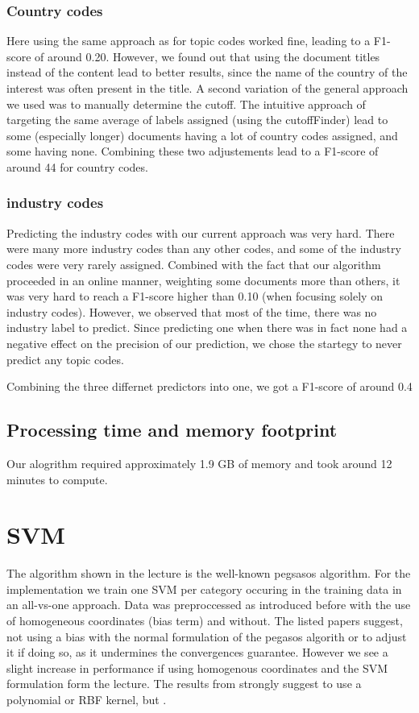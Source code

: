 \documentclass{article}
\begin{document}
            \subsubsection{ Country codes }
                Here using the same approach as for topic codes worked fine, leading to a F1-score of around 0.20. However, we found out that using the document titles instead of the content lead to better results, since the name of the country of the interest was often present in the title. A second variation of the general approach we used was to manually determine the cutoff. The intuitive approach of targeting the same average of labels assigned (using the cutoffFinder) lead to some (especially longer) documents having a lot of country codes assigned, and some having none.
                    Combining these two adjustements lead to a F1-score of around 44 for country codes.


            \subsubsection{industry codes }
            Predicting the industry codes with our current approach was very hard. There were many more industry codes than any other codes, and some of the industry codes were very rarely assigned.  Combined with the fact that our algorithm proceeded in an online manner, weighting some documents more than others, it was very hard to reach a F1-score higher than 0.10 (when focusing solely on industry codes). However, we observed that most of the time, there was no industry label to predict. Since predicting one when there was in fact none had a negative effect on the precision of our prediction, we chose the startegy to never predict any topic codes.

            Combining the three differnet predictors into one, we got a F1-score of around 0.4

    \subsection{Processing time and memory footprint}
        Our alogrithm required approximately 1.9 GB of memory and took around 12 minutes to compute.

\section*{SVM}
The algorithm shown in the lecture is the well-known pegsasos algorithm\cite{shalev-shwartz_pegasos:_2011,shalev-shwartz_pegasos:_????}. For the implementation we train one SVM per category occuring in the training data in an all-vs-one approach.
Data was preproccessed as introduced before with the use of homogeneous coordinates (bias term) and without. The listed papers suggest, not using a bias with the normal formulation of the pegasos algorith or to adjust it if doing so, as it undermines the convergences guarantee. However we see a slight increase in performance if using homogenous coordinates and the SVM formulation form the lecture.
The results from \cite{joachims_text_1998} strongly suggest to use a polynomial or RBF kernel, but .
\end{document}
